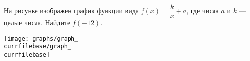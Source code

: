 \begin{ex}
	\begin{condition}
		\begin{minipage}[t]{0.43\textwidth}
			На рисунке изображен график функции вида \( f(x)=\dfrac{k}{x}+a \), где числа \( a \) и \( k \) --- целые числа. Найдите \( f(-12) \).
		\end{minipage}
		\begin{minipage}[c]{0.25\textwidth}
			\texttt{[image: graphs/graph\_\\currfilebase/graph\_\\currfilebase]}
		\end{minipage}
	\end{condition}
\end{ex}